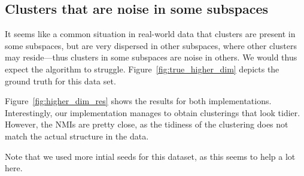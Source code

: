 \documentclass[english]{scrartcl}
\begin{document}
\subsection{Clusters that are noise in some subspaces}

It seems like a common situation in real-world data that clusters are present
in some subspaces, but are very dispersed in other subspaces, where other
clusters may reside---thus clusters in some subspaces are noise in others. We
would thus expect the algorithm to struggle. Figure~\ref{fig:true_higher_dim} depicts
the ground truth for this data set.

Figure~\ref{fig:higher_dim_res} shows the results for both implementations.
Interestingly, our implementation manages to obtain clusterings that
look tidier. However, the NMIs are pretty close, as the tidiness of
the clustering does not match the actual structure in the data.

Note that we used more intial seeds for this dataset, as this seems to
help a lot here.
\end{document}
